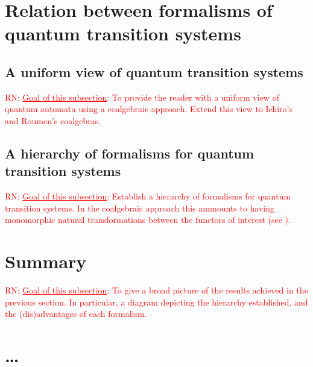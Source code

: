 \documentclass[a4paper, 11pt]{article}
\newcommand{\nevComment}[1]{\textcolor{red}{RN: #1}}
\begin{document}
\section{Relation between formalisms of quantum transition systems}

\subsection{A uniform view of quantum transition systems}

\nevComment{\underline{Goal of this subsection}: To provide the reader with a uniform
view of quantum automata \cite{hirvensalo11} using a coalgebraic approach. Extend this
view to Ichiro's and Roumen's coalgebras.}

\subsection{A hierarchy of formalisms for quantum transition systems}

\nevComment{\underline{Goal of this subsection}: Establish a hierarchy
  of formalisms for quantum transition systems. In the coalgebraic
  approach this ammounts to having monomorphic natural transformations
  between the functors of interest (see \cite[Section 4.4]{sokolova}).}

\section{Summary}

\nevComment{\underline{Goal of this subsection}: To give a broad
  picture of the results achieved in the previous section. In
  particular, a diagram depicting the hierarchy established, and the
  (dis)advantages of each formalism.}


\section{\dots}




\end{document}
